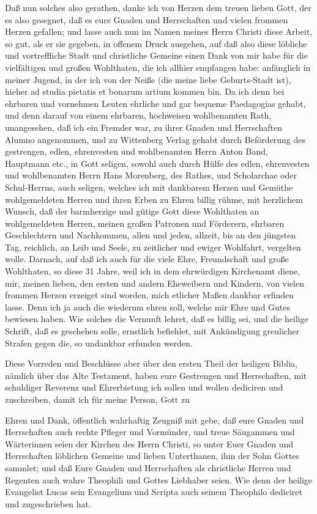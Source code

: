Daß nun solches also gerathen, danke ich von Herzen dem treuen lieben Gott, der es also gesegnet, daß es eure Gnaden und Herrschaften und vielen frommen Herzen gefallen; und lasse auch nun im Namen meines Herrn Christi diese Arbeit, so gut, als er sie gegeben, in offenem Druck ausgehen, auf daß also diese löbliche und vortreffliche Stadt und christliche Gemeine einen Dank von mir habe für die vielfältigen und großen Wohlthaten, die ich allhier empfangen habe: anfänglich in meiner Jugend, in der ich von der Neiße (die meine liebe Geburts-Stadt ist), hieher ad studia pietatis et bonarum artium kommen bin. Da ich denn bei ehrbaren und vornehmen Leuten ehrliche und gar bequeme Paedagogias gehabt, und denn darauf von einem ehrbaren, hochweisen wohlbenamten Rath, unangesehen, daß ich ein Fremder war, zu ihrer Gnaden und Herrschaften Alumno angenommen, und zu Wittenberg Verlag gehabt durch Beförderung des gestrengen, edlen, ehrenvesten und wohlbenamten Herrn Anton Band, Hauptmann etc., in Gott seligen, sowohl auch durch Hülfe des edlen, ehrenvesten und wohlbenamten Herrn Hans Morenberg, des Rathes, und Scholarchae oder Schul-Herrns, auch seligen, welches ich mit dankbarem Herzen und Gemüthe wohlgemeldeten Herren und ihren Erben zu Ehren billig rühme, mit herzlichem Wunsch, daß der barmherzige und gütige Gott diese Wohlthaten an wohlgemeldeten Herren, meinen großen Patronen und Förderern, ehrbaren Geschlechtern und Nachkommen, allen und jeden, allzeit, bis an den jüngsten Tag, reichlich, an Leib und Seele, zu zeitlicher und ewiger Wohlfahrt, vergelten wolle. Darnach, auf daß ich auch für die viele Ehre, Freundschaft und große Wohlthaten, so diese 31 Jahre, weil ich in dem ehrwürdigen Kirchenamt diene, mir, meinen lieben, den ersten und andern Eheweibern und Kindern, von vielen frommen Herzen erzeiget sind worden, mich etlicher Maßen dankbar erfinden lasse. Denn ich ja auch die wiederum ehren soll, welche mir Ehre und Gutes bewiesen haben. Wie solches die Vernunft lehret, daß es billig sei, und die heilige Schrift, daß es geschehen solle, ernstlich befiehlet, mit Ankündigung greulicher Strafen gegen die, so undankbar erfunden werden.

Diese Vorreden und Beschlüsse aber über den ersten Theil der heiligen Biblia, nämlich über das Alte Testament, haben eure Gestrengen und Herrschaften, mit schuldiger Reverenz und Ehrerbietung ich sollen und wollen dediciren und zuschreiben, damit ich für meine Person, Gott zu


Ehren und Dank, öffentlich wahrhaftig Zeugniß mit gebe, daß eure Gnaden und Herrschaften auch rechte Pfleger und Vormünder, und treue Säugammen und Wärterinnen seien der Kirchen des Herrn Christi, so unter Euer Gnaden und Herrschaften löblichen Gemeine und lieben Unterthanen, ihm der Sohn Gottes sammlet; und daß Eure Gnaden und Herrschaften als christliche Herren und Regenten auch wahre Theophili und Gottes Liebhaber seien. Wie denn der heilige Evangelist Lucas sein Evangelium und Scripta auch seinem Theophilo dediciret und zugeschrieben hat.

